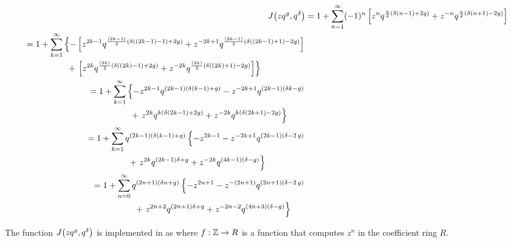 \documentclass{article}
\begin{document}
\begin{align}
  J\!\left(zq^g,q^\delta\right)
  &=
    1 + \sum_{n=1}^\infty (-1)^n \left[
    z^n q^{\frac{n}{2}(\delta (n-1) + 2 g)}
    +
    z^{-n} q^{\frac{n}{2}(\delta (n+1) - 2 g)}
    \right]
  \\
  \begin{split}
  &=
    1 + \sum_{k=1}^\infty
    \left\{
    -\left[
    z^{2k-1}
    q^{\frac{(2k-1)}{2}(\delta ((2k-1)-1) + 2 g)}
    +
    z^{-2k+1}
    q^{\frac{(2k-1)}{2}(\delta ((2k-1)+1) - 2 g)}
    \right]
    \right.
  \notag\\
  &\qquad\qquad\quad
    +
    \left.
    \left[
    z^{2k}
    q^{\frac{(2k)}{2}(\delta ((2k)-1) + 2 g)}
    +
    z^{-2k}
    q^{\frac{(2k)}{2}(\delta ((2k)+1) - 2 g)}
    \right]
  \right\}
  \end{split}
  \notag\\
  \begin{split}
  &=
    1 + \sum_{k=1}^\infty
    \left\{
    -
    z^{2k-1}
    q^{(2k-1)(\delta (k-1) + g)}
    -
    z^{-2k+1}
    q^{(2k-1)(\delta k - g)}
    \right.
  \notag\\
  &\qquad\qquad\quad
    +
    \left.
    z^{2k}
    q^{k (\delta (2k-1) + 2 g)}
    +
    z^{-2k}
    q^{k (\delta (2k+1) - 2 g)}
  \right\}
  \end{split}
  \notag\\
  \begin{split}
  &=
    1 + \sum_{k=1}^\infty
    q^{(2k-1)(\delta (k-1) + g)}
    \left\{
    -
    z^{2k-1}
    -
    z^{-2k+1}
    q^{(2 k - 1) (\delta -2\, g)}
    \right.
    \notag\\
    &\qquad\qquad\quad
    +
    \left.
    z^{2k}
    q^{(2 k - 1) \delta + g}
    +
    z^{-2k}
    q^{(4k-1) (\delta - g)}
  \right\}
  \end{split}
  \notag\\
  \begin{split}
  &=
    1 + \sum_{n=0}^\infty
    q^{(2n+1)(\delta n + g)}
    \left\{
    -
    z^{2n+1}
    -
    z^{-(2n+1)}
    q^{(2n+1) (\delta -2\, g)}
    \right.
    \notag\\
    &\qquad\qquad\quad
    +
    \left.
    z^{2n+2}
    q^{(2 n + 1) \delta + g}
    +
    z^{-2n-2}
    q^{(4n+3) (\delta - g)}
  \right\}
  \end{split}
\end{align}

The function $J\!\left(z q^g,q^\delta\right)$ is implemented in
 as  where
$f: \mathbb{Z} \to R$ is a function that computes $z^n$ in the coefficient
ring $R$.
\end{document}
